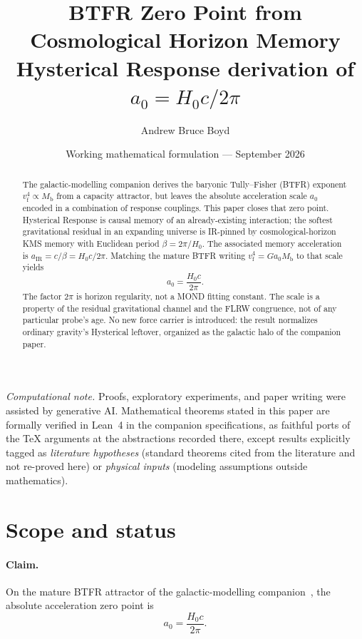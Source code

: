 \documentclass[11pt]{article}
\title{\textbf{BTFR Zero Point from Cosmological Horizon Memory}\\[0.45em]
\large Hysterical Response derivation of $a_0=H_0c/2\pi$}
\author{Andrew Bruce Boyd}
\date{Working mathematical formulation --- September 2026}
\theoremstyle{definition}
\theoremstyle{remark}
\newcommand{\Mb}{M_{\mathrm{b}}}
\newcommand{\vf}{v_{\mathrm{f}}}
\begin{document}
\maketitle
\noindent\textit{Computational note.}
Proofs, exploratory experiments, and paper writing were assisted by generative AI.
Mathematical theorems stated in this paper are formally verified in Lean~4 in the
companion specifications, as faithful ports of the TeX arguments at the abstractions
recorded there, except results explicitly tagged as \emph{literature hypotheses}
(standard theorems cited from the literature and not re-proved here) or
\emph{physical inputs} (modeling assumptions outside mathematics).

\begin{abstract}
The galactic-modelling companion derives the baryonic Tully--Fisher (BTFR) exponent
$\vf^{4}\propto\Mb$ from a capacity attractor, but leaves the absolute acceleration
scale $a_0$ encoded in a combination of response couplings.
This paper closes that zero point.
Hysterical Response is causal memory of an already-existing interaction; the softest
gravitational residual in an expanding universe is IR-pinned by cosmological-horizon
KMS memory with Euclidean period $\beta=2\pi/H_0$.
The associated memory acceleration is $a_{\mathrm{IR}}=c/\beta=H_0c/2\pi$.
Matching the mature BTFR writing $\vf^{4}=Ga_0\Mb$ to that scale yields
\begin{equation*}
  \boxed{a_0=\frac{H_0c}{2\pi}.}
\end{equation*}
The factor $2\pi$ is horizon regularity, not a MOND fitting constant.
The scale is a property of the residual gravitational channel and the FLRW congruence,
not of any particular probe's age.
No new force carrier is introduced: the result normalizes ordinary gravity's Hysterical
leftover, organized as the galactic halo of the companion paper.
\end{abstract}
\tableofcontents
\newpage

\section{Scope and status}
\label{sec:scope}
\paragraph{Claim.}
On the mature BTFR attractor of the galactic-modelling companion~\cite{boyd2026galactic},
the absolute acceleration zero point is
\begin{equation}
\label{eq:claim}
\boxed{a_0=\frac{H_0c}{2\pi}.}
\end{equation}
\end{document}
